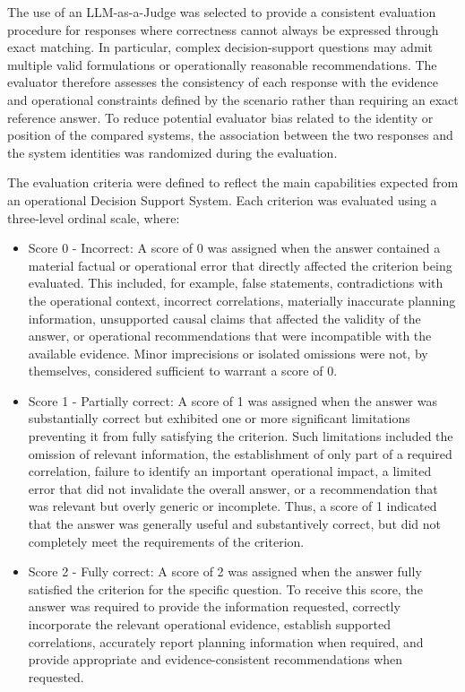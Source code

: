 The use of an LLM-as-a-Judge was selected to provide a consistent evaluation procedure for responses where correctness cannot always be expressed through exact matching. In particular, complex decision-support questions may admit multiple valid formulations or operationally reasonable recommendations. The evaluator therefore assesses the consistency of each response with the evidence and operational constraints defined by the scenario rather than requiring an exact reference answer. To reduce potential evaluator bias related to the identity or position of the compared systems, the association between the two responses and the system identities was randomized during the evaluation.



The evaluation criteria were defined to reflect the main capabilities expected from an operational Decision Support System. Each criterion was evaluated using a three-level ordinal scale, where:

\begin{itemize}
   \item Score 0 - Incorrect: A score of 0 was assigned when the answer contained a material factual or operational error that directly affected the criterion being evaluated. This included, for example, false statements, contradictions with the operational context, incorrect correlations, materially inaccurate planning information, unsupported causal claims that affected the validity of the answer, or operational recommendations that were incompatible with the available evidence. Minor imprecisions or isolated omissions were not, by themselves, considered sufficient to warrant a score of 0.
   \item Score 1 - Partially correct: A score of 1 was assigned when the answer was substantially correct but exhibited one or more significant limitations preventing it from fully satisfying the criterion. Such limitations included the omission of relevant information, the establishment of only part of a required correlation, failure to identify an important operational impact, a limited error that did not invalidate the overall answer, or a recommendation that was relevant but overly generic or incomplete. Thus, a score of 1 indicated that the answer was generally useful and substantively correct, but did not completely meet the requirements of the criterion.
   \item Score 2 - Fully correct: A score of 2 was assigned when the answer fully satisfied the criterion for the specific question. To receive this score, the answer was required to provide the information requested, correctly incorporate the relevant operational evidence, establish supported correlations, accurately report planning information when required, and provide appropriate and evidence-consistent recommendations when requested.
\end{itemize}




